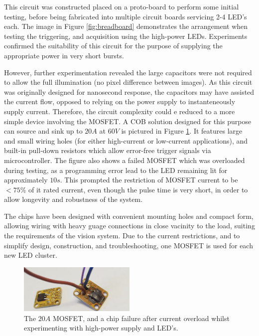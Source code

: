 \documentclass[fleqn,twoside]{article}
\begin{document}
This circuit was constructed placed on a proto-board to perform some initial testing, before being fabricated into multiple circuit boards servicing 2-4 LED's each. The image in Figure \ref{fig:breadboard} demonstrates the arrangement when testing the triggering, and acquisition using the high-power LEDs. Experiments confirmed the suitability of this circuit for the purpose of supplying the appropriate power in very short bursts. 

However, further experimentation revealed the large capacitors were not required to allow the full illumination (no pixel difference between images). As this circuit was originally designed for nanosecond response, the capacitors may have assisted the current flow, opposed to relying on the power supply to instanteneously supply current. Therefore, the circuit complexity could e reduced to a more simple device involving the MOSFET. A COB solution designed for this purpose can source and sink up to $20A$ at $60V$ is pictured in Figure \ref{fig:mosfet}. It features large and small wiring holes (for either high-current or low-current applications), and built-in pull-down resistors which allow error-free trigger signals via microcontroller. The figure also shows a failed MOSFET which was overloaded during testing, as a programming error lead to the LED remaining lit for approximately $10s$. This prompted the restriction of MOSFET current to be $<75\%$ of it rated current, even though the pulse time is very short, in order to allow longevity and robustness of the system.

The chips have been designed with convenient mounting holes and compact form, allowing wiring with heavy guage connections in close vacinity to the load, suiting the requirements of the vision system. Due to the current restrictions, and to simplify design, construction, and troubleshooting, one MOSFET is used for each new LED cluster. 

\begin{figure}
	\begin{center}
		\includegraphics[width=0.5\textwidth]{mosfet.png}
	\end{center}
	\caption{The $20A$ MOSFET, and a chip failure after current overload whilst experimenting with high-power supply and LED's.}
	\label{fig:mosfet}
\end{figure} 
\end{document}
